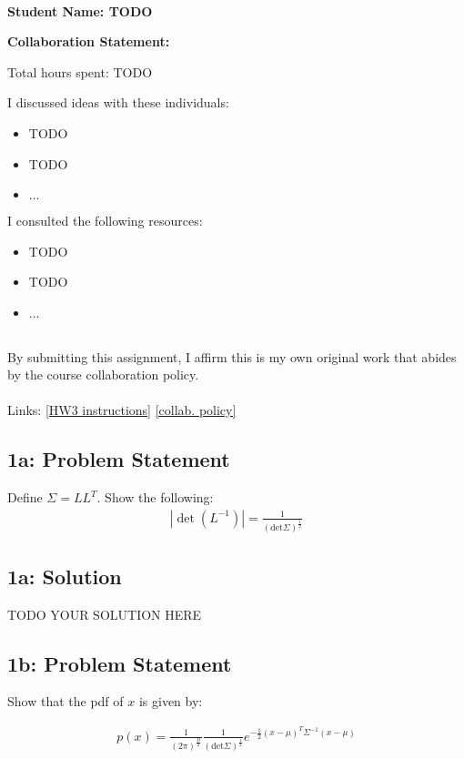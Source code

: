 \documentclass[10pt]{article}
\newcommand{\officialdirections}[1]{{\color{purple} #1}}
\begin{document}
~~\\ %

{\Large{\bf Student Name: TODO}}

\Large{\bf Collaboration Statement:}

Total hours spent: TODO

I discussed ideas with these individuals:
\begin{itemize}
\item TODO
\item TODO
\item $\ldots$	
\end{itemize}

I consulted the following resources:
\begin{itemize}
\item TODO
\item TODO
\item $\ldots$	
\end{itemize}
~~\\
By submitting this assignment, I affirm this is my own original work that abides by the course collaboration policy.
~~\\
~~\\
Links: 
\href{https://www.cs.tufts.edu/cs/136/2023s/hw3.html}{[HW3 instructions]} 
\href{https://www.cs.tufts.edu/cs/136/2023s/index.html#collaboration}{[collab. policy]} 

\tableofcontents

\newpage

\officialdirections{
\subsection*{1a: Problem Statement}
Define $\Sigma = L L^T$. Show the following:
\begin{align}
| \det (L^{-1}) | = \frac{1}{(\text{det} \Sigma)^{\frac{1}{2}}}
\end{align}
}

\subsection{1a: Solution}
TODO YOUR SOLUTION HERE


\officialdirections{
\subsection*{1b: Problem Statement}
Show that the pdf of $x$ is given by:

\begin{align}
p(x) = \frac{1}{(2\pi)^{\frac{D}{2}}}
\frac{1}{(\text{det} \Sigma)^{\frac{1}{2}}}
e^{-\frac{1}{2} (x-\mu)^T \Sigma^{-1} (x-\mu)}
\end{align}
}
\end{document}
